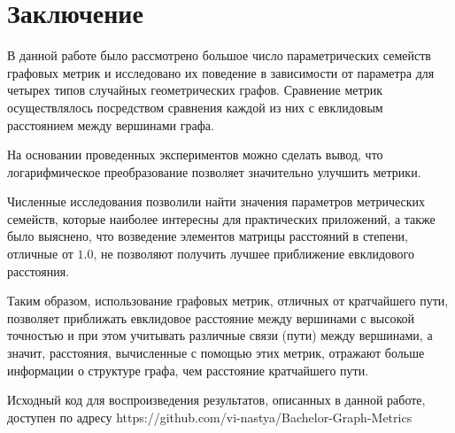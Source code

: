 \chapter*{Заключение}						%

В данной работе было рассмотрено большое число параметрических семейств графовых метрик и исследовано их поведение в зависимости от параметра для четырех типов случайных геометрических графов. Сравнение метрик осуществлялось посредством сравнения каждой из них с евклидовым расстоянием между вершинами графа.

На основании проведенных экспериментов можно сделать вывод, что логарифмическое преобразование позволяет значительно улучшить метрики.

Численные исследования позволили найти значения параметров метрических семейств, которые наиболее интересны для практических приложений, а также было выяснено, что возведение элементов матрицы расстояний в степени, отличные от $1.0$, не позволяют получить лучшее приближение евклидового расстояния.

Таким образом, использование графовых метрик, отличных от кратчайшего пути, позволяет приближать евклидовое расстояние между вершинами с высокой точностью и при этом учитывать различные связи (пути) между вершинами, а значит, расстояния, вычисленные с помощью этих метрик, отражают больше информации о структуре графа, чем расстояние кратчайшего пути.

Исходный код для воспроизведения результатов, описанных в данной работе, доступен по адресу https://github.com/vi-nastya/Bachelor-Graph-Metrics
